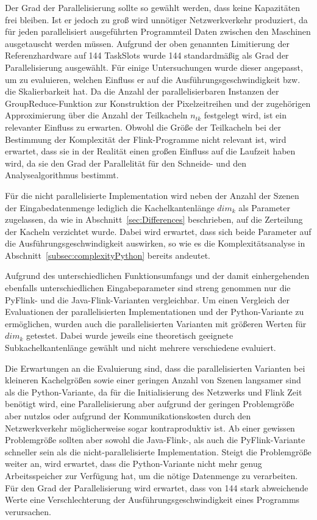 Der Grad der Parallelisierung sollte so gewählt werden, dass keine Kapazitäten frei bleiben. Ist er jedoch zu groß wird unnötiger Netzwerkverkehr produziert, da für jeden parallelisiert ausgeführten Programmteil Daten zwischen den Maschinen ausgetauscht werden müssen. Aufgrund der oben genannten Limitierung der Referenzhardware auf 144 TaskSlots wurde 144 standardmäßig als Grad der Parallelisierung ausgewählt. Für einige Untersuchungen wurde dieser angepasst, um zu evaluieren, welchen Einfluss er auf die Ausführungsgeschwindigkeit bzw. die Skalierbarkeit hat. Da die Anzahl der parallelisierbaren Instanzen der GroupReduce-Funktion zur Konstruktion der Pixelzeitreihen und der zugehörigen Approximierung über die Anzahl der Teilkacheln $n_{tk}$ festgelegt wird, ist ein relevanter Einfluss zu erwarten. Obwohl die Größe der Teilkacheln bei der Bestimmung der Komplexität der Flink-Programme nicht relevant ist, wird erwartet, dass sie in der Realität einen großen Einfluss auf die Laufzeit haben wird, da sie den Grad der Parallelität für den Schneide- und den Analysealgorithmus bestimmt.

Für die nicht parallelisierte Implementation wird neben der Anzahl der Szenen der Eingabedatenmenge lediglich die Kachelkantenlänge $dim_k$ als Parameter zugelassen, da wie in Abschnitt~\ref{sec:Differences} beschrieben, auf die Zerteilung der Kacheln verzichtet wurde. Dabei wird erwartet, dass sich beide Parameter auf die Ausführungsgeschwindigkeit auswirken, so wie es die Komplexitätsanalyse in Abschnitt~\ref{subsec:complexityPython} bereits andeutet.

Aufgrund des unterschiedlichen Funktionsumfangs und der damit einhergehenden ebenfalls unterschiedlichen Eingabeparameter sind streng genommen nur die PyFlink- und die Java-Flink-Varianten vergleichbar. Um einen Vergleich der Evaluationen der parallelisierten Implementationen und der Python-Variante zu ermöglichen, wurden auch die parallelisierten Varianten mit größeren Werten für $dim_k$ getestet. Dabei wurde jeweils eine theoretisch geeignete Subkachelkantenlänge gewählt und nicht mehrere verschiedene evaluiert.

Die Erwartungen an die Evaluierung sind, dass die parallelisierten Varianten bei kleineren Kachelgrößen sowie einer geringen Anzahl von Szenen langsamer sind als die Python-Variante, da für die Initialisierung des Netzwerks und Flink Zeit benötigt wird, eine Parallelisierung aber aufgrund der geringen Problemgröße aber nutzlos oder aufgrund der Kommunikationskosten durch den Netzwerkverkehr möglicherweise sogar kontraproduktiv ist. Ab einer gewissen Problemgröße sollten aber sowohl die Java-Flink-, als auch die PyFlink-Variante schneller sein als die nicht-parallelisierte Implementation. Steigt die Problemgröße weiter an, wird erwartet, dass die Python-Variante nicht mehr genug Arbeitsspeicher zur Verfügung hat, um die nötige Datenmenge zu verarbeiten. Für den Grad der Parallelisierung wird erwartet, dass von 144 stark abweichende Werte eine Verschlechterung der Ausführungsgeschwindigkeit eines Programms verursachen.

